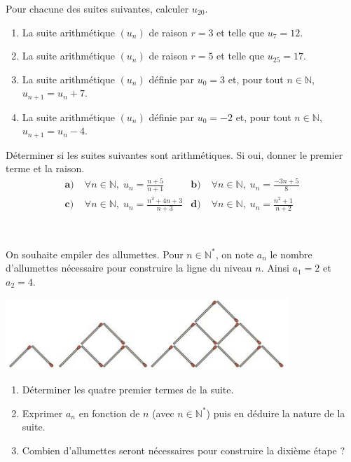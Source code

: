 \documentclass[11pt]{article}
\begin{document}
\begin{exo}
  Pour chacune des suites suivantes, calculer $u_{20}$.
  \begin{enumerate}
    \item La suite arithmétique $\left( u_n \right)$ de raison $r=3$ et telle
      que $u_7=12$.
    \item La suite arithmétique $\left( u_n \right)$ de raison $r=5$ et telle
      que $u_{25}=17$.
    \item La suite arithmétique $\left( u_n \right)$ définie par $u_0=3$ et,
      pour tout $n\in\mathbb{N}$, $u_{n+1}=u_n+7$.
    \item La suite arithmétique $\left( u_n \right)$ définie par $u_0=-2$ et,
      pour tout $n\in\mathbb{N}$, $u_{n+1}=u_n-4$.
  \end{enumerate}
\end{exo}

\begin{exo}
  Déterminer si les suites suivantes sont arithmétiques. Si oui, donner le
  premier terme et la raison.
  \begin{align*}
    \textbf{a)}\;& \forall n\in\mathbb{N},\; u_n = \frac{n+5}{n+1} &
    \textbf{b)}\;& \forall n\in\mathbb{N},\; u_n = \frac{-3n+5}{8} \\
    \textbf{c)}\;& \forall n\in\mathbb{N},\; u_n = \frac{n^2+4n+3}{n+3} &
    \textbf{d)}\;& \forall n\in\mathbb{N},\; u_n = \frac{n^2+1}{n+2}
  \end{align*}
\end{exo}

\begin{exo}~\\
  \begin{minipage}[]{.5\textwidth}
    On souhaite empiler des allumettes. Pour $n\in\mathbb{N}^*$, on note $a_n$
    le nombre d'allumettes nécessaire pour construire la ligne du niveau $n$.
    Ainsi $a_1=2$ et $a_2=4$.
  \end{minipage}
  \begin{minipage}[]{.5\textwidth}
    \begin{center}
      \includegraphics[scale=.6]{matches.png}
    \end{center}
  \end{minipage}
  \begin{enumerate}
      \item Déterminer les quatre premier termes de la suite.
      \item Exprimer $a_n$ en fonction de $n$ (avec $n\in\mathbb{N}^*$) puis en
        déduire la nature de la suite.
      \item Combien d'allumettes seront nécessaires pour construire la dixième
        étape ?
  \end{enumerate}
\end{exo}
\end{document}
